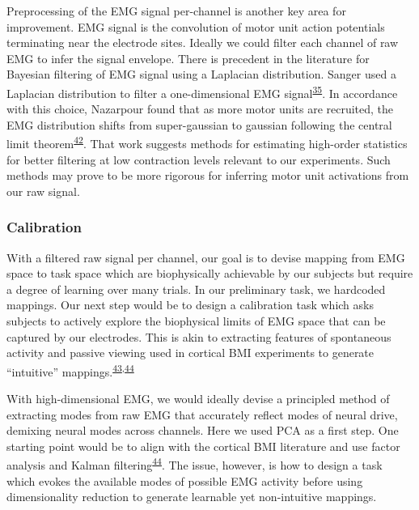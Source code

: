 \documentclass[
  a4paper,
]{article}
\begin{document}
Preprocessing of the EMG signal per-channel is another key area for
improvement. EMG signal is the convolution of motor unit action
potentials terminating near the electrode sites. Ideally we could filter
each channel of raw EMG to infer the signal envelope. There is precedent
in the literature for Bayesian filtering of EMG signal using a Laplacian
distribution. Sanger used a Laplacian distribution to filter a
one-dimensional EMG
signal\textsuperscript{\protect\hyperlink{ref-sangerBayesianFilteringMyoelectric2007}{35}}.
In accordance with this choice, Nazarpour found that as more motor units
are recruited, the EMG distribution shifts from super-gaussian to
gaussian following the central limit
theorem\textsuperscript{\protect\hyperlink{ref-nazarpourNoteProbabilityDistribution2013}{42}}.
That work suggests methods for estimating high-order statistics for
better filtering at low contraction levels relevant to our experiments.
Such methods may prove to be more rigorous for inferring motor unit
activations from our raw signal.

\hypertarget{calibration}{%
\subsubsection{Calibration}\label{calibration}}

With a filtered raw signal per channel, our goal is to devise mapping
from EMG space to task space which are biophysically achievable by our
subjects but require a degree of learning over many trials. In our
preliminary task, we hardcoded mappings. Our next step would be to
design a calibration task which asks subjects to actively explore the
biophysical limits of EMG space that can be captured by our electrodes.
This is akin to extracting features of spontaneous activity and passive
viewing used in cortical BMI experiments to generate ``intuitive''
mappings.\textsuperscript{\protect\hyperlink{ref-Clancy2014}{43},\protect\hyperlink{ref-sadtlerNeuralConstraintsLearning2014}{44}}

With high-dimensional EMG, we would ideally devise a principled method
of extracting modes from raw EMG that accurately reflect modes of neural
drive, demixing neural modes across channels. Here we used PCA as a
first step. One starting point would be to align with the cortical BMI
literature and use factor analysis and Kalman
filtering\textsuperscript{\protect\hyperlink{ref-sadtlerNeuralConstraintsLearning2014}{44}}.
The issue, however, is how to design a task which evokes the available
modes of possible EMG activity before using dimensionality reduction to
generate learnable yet non-intuitive mappings.
\end{document}

